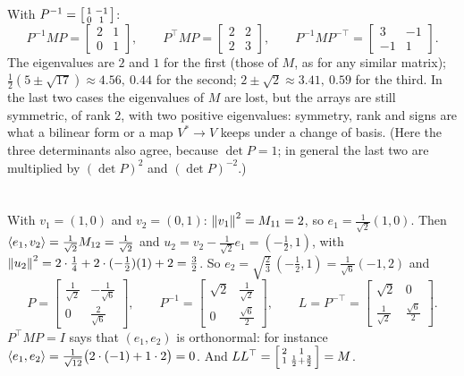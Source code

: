 With $P^{-1} = \begin{bsmallmatrix}1 & -1\\0 & 1\end{bsmallmatrix}$:
\[
  P^{-1}MP = \begin{bmatrix}2 & 1\\0 & 1\end{bmatrix},
  \qquad
  P^\top MP = \begin{bmatrix}2 & 2\\2 & 3\end{bmatrix},
  \qquad
  P^{-1}MP^{-\top} = \begin{bmatrix}3 & -1\\-1 & 1\end{bmatrix}.
\]
The eigenvalues are $2$ and $1$ for the first (those of $M$, as for any
similar matrix); $\frac12(5\pm\sqrt{17})\approx4.56,\ 0.44$ for the second;
$2\pm\sqrt2\approx3.41,\ 0.59$ for the third. In the last two cases the
eigenvalues of $M$ are lost, but the arrays are still symmetric, of rank
$2$, with two positive eigenvalues: symmetry, rank and signs are what a
bilinear form or a map $V^*\to V$ keeps under a change of basis. (Here the
three determinants also agree, because $\det P = 1$; in general the last
two are multiplied by $(\det P)^2$ and $(\det P)^{-2}$.)

\section{}

With $v_1 = (1, 0)$ and $v_2 = (0, 1)$: $\left\|v_1\right\|^2 = M_{11} = 2$, so
$e_1 = \frac1{\sqrt2}(1, 0)$. Then
$\left\langle e_1, v_2 \right\rangle = \frac1{\sqrt2}M_{12} = \frac1{\sqrt2}$ and
$u_2 = v_2 - \frac1{\sqrt2}e_1 = (-\frac12, 1)$, with
$\left\|u_2\right\|^2 = 2\cdot\frac14 + 2\cdot(-\frac12)(1) + 2 = \frac32$. So
$e_2 = \sqrt{\tfrac23}\,(-\frac12, 1) = \frac1{\sqrt6}(-1, 2)$ and
\[
  P = \begin{bmatrix}\frac1{\sqrt2} & -\frac1{\sqrt6}\\[2pt]
      0 & \frac2{\sqrt6}\end{bmatrix},
  \qquad
  P^{-1} = \begin{bmatrix}\sqrt2 & \frac1{\sqrt2}\\[2pt]
      0 & \frac{\sqrt6}2\end{bmatrix},
  \qquad
  L = P^{-\top} = \begin{bmatrix}\sqrt2 & 0\\[2pt]
      \frac1{\sqrt2} & \frac{\sqrt6}2\end{bmatrix}.
\]
$P^\top MP = I$ says that $(e_1, e_2)$ is orthonormal: for instance
$\left\langle e_1, e_2 \right\rangle = \frac1{\sqrt{12}}\bigl(2\cdot(-1) + 1\cdot2\bigr) = 0$.
And $LL^\top = \begin{bsmallmatrix}2 & 1\\1 & \frac12 + \frac32
\end{bsmallmatrix} = M$.

